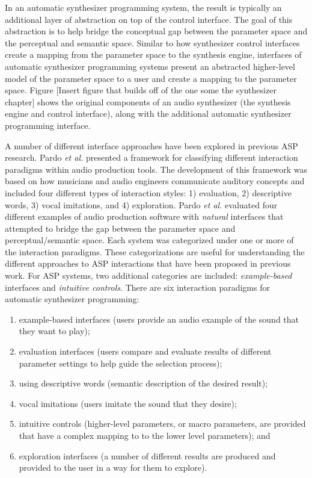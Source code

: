\label{sec:asp-approaches}
In an automatic synthesizer programming system, the result is typically an additional layer of abstraction on top of the control interface. The goal of this abstraction is to help bridge the conceptual gap between the parameter space and the perceptual and semantic space. Similar to how synthesizer control interfaces create a mapping from the parameter space to the synthesis engine, interfaces of automatic synthesizer programming systems present an abstracted higher-level model of the parameter space to a user and create a mapping to the parameter space. Figure [Insert figure that builds off of the one some the synthesizer chapter] shows the original components of an audio synthesizer (the synthesis engine and control interface), along with the additional automatic synthesizer programming interface.

A number of different interface approaches have been explored in previous ASP research. Pardo \textit{et al.} \cite{pardo2019learning} presented a framework for classifying different interaction paradigms within audio production tools. The development of this framework was based on how musicians and audio engineers communicate auditory concepts and included four different types of interaction styles: 1) evaluation, 2) descriptive words, 3) vocal imitations, and 4) exploration. Pardo \textit{et al.} evaluated four different examples of audio production software with \textit{natural} interfaces that attempted to bridge the gap between the parameter space and perceptual/semantic space. Each system was categorized under one or more of the interaction paradigms. These categorizations are useful for understanding the different approaches to ASP interactions that have been proposed in previous work. For ASP systems, two additional categories are included: \textit{example-based} interfaces and \textit{intuitive controls}. There are six interaction paradigms for automatic synthesizer programming:

\begin{enumerate}
    \item example-based interfaces (users provide an audio example of the sound that they want to play);
    \item evaluation interfaces (users compare and evaluate results of different parameter settings to help guide the selection process);
    \item using descriptive words (semantic description of the desired result);
    \item vocal imitations (users imitate the sound that they desire);
    \item intuitive controls (higher-level parameters, or macro parameters, are provided that have a complex mapping to to the lower level parameters); and
    \item exploration interfaces (a number of different results are produced and provided to the user in a way for them to explore).
\end{enumerate}

